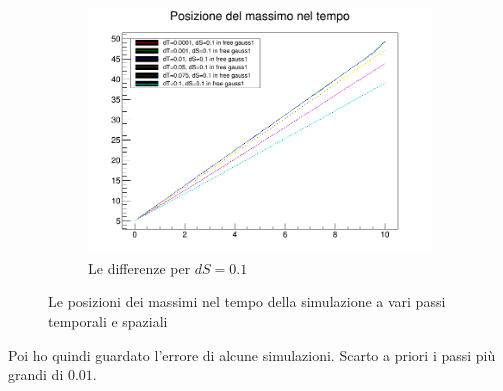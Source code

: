 \begin{figure}[h]
\begin{subfigure}[b]{0.5\textwidth}
\includegraphics[width=\textwidth]{IMG/v_g1_01}
\caption[Differenze in 0.1]{Le differenze per $dS = 0.1$}
\end{subfigure}
\caption{Le posizioni dei massimi nel tempo della simulazione a vari passi temporali  e spaziali}\label{fig:velocita}
\end{figure}

Poi ho quindi guardato l'errore di alcune simulazioni. Scarto a priori i passi pi\`u grandi di $0.01$.

